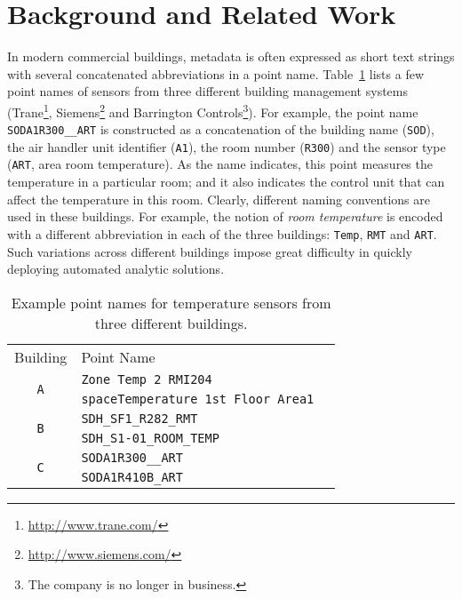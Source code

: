 \section{Background and Related Work} 

In modern commercial buildings, metadata
is often expressed as short text strings with several concatenated abbreviations
in a point name. Table~\ref{table:ex} lists a few point names of sensors from
three different building management systems
(Trane\footnote{\url{http://www.trane.com/}},
Siemens\footnote{\url{http://www.siemens.com/}} and Barrington
Controls\footnote{The company is no longer in business.}). For example, the
point name \texttt{SODA1R300\_\_ART} is constructed as a concatenation of the
building name (\texttt{SOD}), the air handler unit identifier (\texttt{A1}), the
room number (\texttt{R300}) and the sensor type (\texttt{ART}, area room
temperature). As the name indicates, this point measures the temperature in a
particular room; and it also indicates the control unit that can affect the
temperature in this room. Clearly, different naming conventions are used in
these buildings. For example, the notion of {\em room temperature} is encoded
with a different abbreviation in each of the three buildings: \texttt{Temp},
\texttt{RMT} and \texttt{ART}. Such variations across different buildings impose
great difficulty in quickly deploying automated analytic solutions.

\begin{table}[h]
\centering
\begin{tabular}{c|ll}
\cline{1-2}
Building & Point Name & \\
\cline{1-2}
\multirow{2}{*}{\texttt{A}}  & \texttt{Zone Temp 2 RMI204} &  \\
					& \texttt{spaceTemperature 1st Floor Area1} &  \\ \cline{1-2}
\multirow{2}{*}{\texttt{B}} & \texttt{SDH\_SF1\_R282\_RMT} &  \\
                     & \texttt{SDH\_S1-01\_ROOM\_TEMP} &  \\ \cline{1-2}
\multirow{2}{*}{\texttt{C}}  & \texttt{SODA1R300\_\_ART} &  \\
					  & \texttt{SODA1R410B\_ART} &  \\ \cline{1-2}
\end{tabular}
\caption{Example point names for temperature sensors from three different buildings.}
\label{table:ex}
\end{table}


